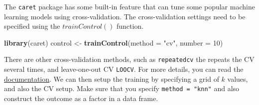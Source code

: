 \documentclass[
]{book}
\newenvironment{Shaded}{\begin{snugshade}}{\end{snugshade}}
\newcommand{\AttributeTok}[1]{\textcolor[rgb]{0.13,0.29,0.53}{#1}}
\newcommand{\DecValTok}[1]{\textcolor[rgb]{0.00,0.00,0.81}{#1}}
\newcommand{\FunctionTok}[1]{\textcolor[rgb]{0.13,0.29,0.53}{\textbf{#1}}}
\newcommand{\NormalTok}[1]{#1}
\newcommand{\OtherTok}[1]{\textcolor[rgb]{0.56,0.35,0.01}{#1}}
\newcommand{\SpecialCharTok}[1]{\textcolor[rgb]{0.81,0.36,0.00}{\textbf{#1}}}
\newcommand{\StringTok}[1]{\textcolor[rgb]{0.31,0.60,0.02}{#1}}
\theoremstyle{definition}
\theoremstyle{definition}
\theoremstyle{definition}
\theoremstyle{definition}
\theoremstyle{remark}
\begin{document}
The \texttt{caret} package has some built-in feature that can tune some popular machine learning models using cross-validation. The cross-validation settings need to be specified using the \(trainControl()\) function.

\begin{Shaded}
\begin{Highlighting}[]
  \FunctionTok{library}\NormalTok{(caret)}
\NormalTok{  control }\OtherTok{\textless{}{-}} \FunctionTok{trainControl}\NormalTok{(}\AttributeTok{method =} \StringTok{"cv"}\NormalTok{, }\AttributeTok{number =} \DecValTok{10}\NormalTok{)}
\end{Highlighting}
\end{Shaded}

There are other cross-validation methods, such as \texttt{repeatedcv} the repeats the CV several times, and leave-one-out CV \texttt{LOOCV}. For more details, you can read the \href{https://www.rdocumentation.org/packages/caret/versions/6.0-88/topics/trainControl}{documentation}. We can then setup the training by specifying a grid of \(k\) values, and also the CV setup. Make sure that you specify \texttt{method\ =\ "knn"} and also construct the outcome as a factor in a data frame.

\begin{Shaded}
\end{Shaded}
\end{document}
